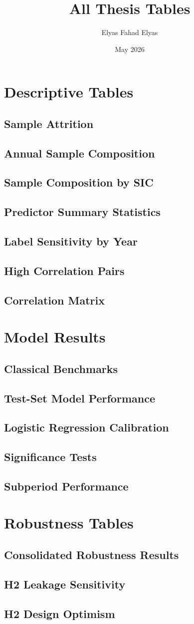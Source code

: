 \documentclass[11pt,a4paper]{article}
\title{All Thesis Tables}
\author{Elyas Fahad Elyas}
\date{May 2026}
\newcommand{\tablefile}[2]{%
  \clearpage
  \subsection*{#1}
  \begingroup
  
  \endgroup
}
\begin{document}
\maketitle
\tableofcontents
\clearpage

\section{Descriptive Tables}
\tablefile{Sample Attrition}{outputs/tables/descriptive/sample_attrition.tex}
\tablefile{Annual Sample Composition}{outputs/tables/descriptive/sample_composition_annual.tex}
\tablefile{Sample Composition by SIC}{outputs/tables/descriptive/sample_composition_by_sic.tex}
\tablefile{Predictor Summary Statistics}{outputs/tables/descriptive/predictor_summary_stats.tex}
\tablefile{Label Sensitivity by Year}{outputs/tables/descriptive/label_sensitivity_annual.tex}
\tablefile{High Correlation Pairs}{outputs/tables/descriptive/high_correlation_pairs.tex}
\tablefile{Correlation Matrix}{outputs/tables/descriptive/correlation_matrix.tex}

\section{Model Results}
\tablefile{Classical Benchmarks}{outputs/tables/model_results/classical_benchmarks.tex}
\tablefile{Test-Set Model Performance}{outputs/tables/model_results/model_performance_test.tex}
\tablefile{Logistic Regression Calibration}{outputs/tables/model_results/lr_calibration_comparison.tex}
\tablefile{Significance Tests}{outputs/tables/model_results/significance_tests.tex}
\tablefile{Subperiod Performance}{outputs/tables/model_results/subperiod_performance.tex}

\section{Robustness Tables}
\tablefile{Consolidated Robustness Results}{outputs/tables/robustness/robustness_consolidated.tex}
\tablefile{H2 Leakage Sensitivity}{outputs/tables/robustness/h2_leakage_all_results.tex}
\tablefile{H2 Design Optimism}{outputs/tables/robustness/h2_design_optimism.tex}
\end{document}
